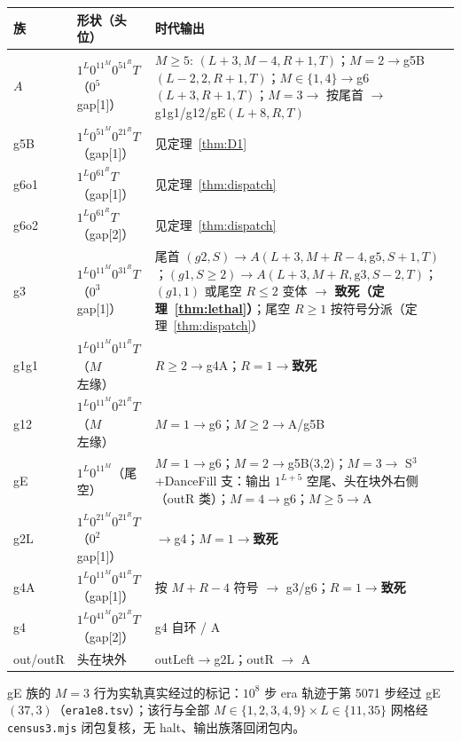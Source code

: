 \documentclass[11pt]{ctexart}
\begin{document}
\begin{center}\small
\begin{tabular}{llp{8.8cm}}
\toprule
族 & 形状（头位） & 时代输出\\
\midrule
$A$ & $1^L0^11^M0^51^RT$（$0^5$gap[1]） & $M\ge5$: $(L{+}3,M{-}4,R{+}1,T)$；$M{=}2\to$g5B$(L{-}2,2,R{+}1,T)$；$M\in\{1,4\}\to$g6$(L{+}3,R{+}1,T)$；$M{=}3\to$ 按尾首 $\to$ g1g1/g12/gE$(L{+}8,R,T)$\\
g5B & $1^L0^51^M0^21^RT$（gap[1]） & 见定理~\ref{thm:D1}\\
g6o1 & $1^L0^61^RT$（gap[1]） & 见定理~\ref{thm:dispatch}\\
g6o2 & $1^L0^61^RT$（gap[2]） & 见定理~\ref{thm:dispatch}\\
g3 & $1^L0^11^M0^31^RT$（$0^3$gap[1]） & 尾首 $(g2,S)\to A(L{+}3,M{+}R{-}4,\mathrm{g5},S{+}1,T)$；$(g1,S{\ge}2)\to A(L{+}3,M{+}R,\mathrm{g3},S{-}2,T)$；$(g1,1)$ 或尾空 $R\le2$ 变体 $\to$ \textbf{致死（定理~\ref{thm:lethal}）}；尾空 $R\ge1$ 按符号分派（定理~\ref{thm:dispatch}）\\
g1g1 & $1^L0^11^M0^11^RT$（$M$ 左缘） & $R\ge2\to$g4A；$R{=}1\to$\textbf{致死}\\
g12 & $1^L0^11^M0^21^RT$（$M$ 左缘） & $M{=}1\to$g6；$M\ge2\to$A/g5B\\
gE & $1^L0^11^M$（尾空） & $M{=}1\to$g6；$M{=}2\to$g5B(3,2)；$M{=}3\to$ S$^3$+DanceFill 支：输出 $1^{L+5}$ 空尾、头在块外右侧（outR 类）；$M{=}4\to$g6；$M\ge5\to$A\\
g2L & $1^L0^21^M0^21^RT$（$0^2$gap[1]） & $\to$g4；$M{=}1\to$\textbf{致死}\\
g4A & $1^L0^11^M0^41^RT$（gap[1]） & 按 $M{+}R{-}4$ 符号 $\to$ g3/g6；$R{=}1\to$\textbf{致死}\\
g4 & $1^L0^41^M0^21^RT$（gap[2]） & g4 自环 / A\\
out/outR & 头在块外 & outLeft$\to$g2L；outR $\to$ A\\
\bottomrule
\end{tabular}
\end{center}

gE 族的 $M{=}3$ 行为实轨真实经过的标记：$10^8$ 步 era 轨迹于第 5071 步经过 gE$(37,3)$（\texttt{era1e8.tsv}）；该行与全部 $M\in\{1,2,3,4,9\}\times L\in\{11,35\}$ 网格经 \texttt{census3.mjs} 闭包复核，无 halt、输出族落回闭包内。
\end{document}

